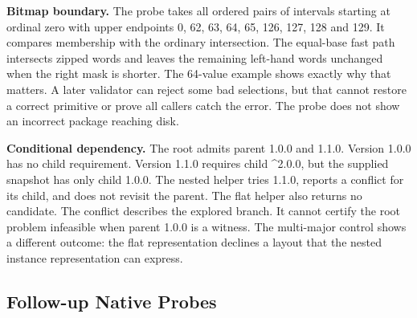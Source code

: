 \documentclass[
  11pt,
  letterpaper,
]{article}
\begin{document}
\textbf{Bitmap boundary.} The probe takes all ordered pairs of intervals
starting at ordinal zero with upper endpoints 0, 62, 63, 64, 65, 126,
127, 128 and 129. It compares membership with the ordinary intersection.
The equal-base fast path intersects zipped words and leaves the
remaining left-hand words unchanged when the right mask is shorter. The
64-value example shows exactly why that matters. A later validator can
reject some bad selections, but that cannot restore a correct primitive
or prove all callers catch the error. The probe does not show an
incorrect package reaching disk.

\textbf{Conditional dependency.} The root admits parent 1.0.0 and 1.1.0.
Version 1.0.0 has no child requirement. Version 1.1.0 requires child
\^{}2.0.0, but the supplied snapshot has only child 1.0.0. The nested
helper tries 1.1.0, reports a conflict for its child, and does not
revisit the parent. The flat helper also returns no candidate. The
conflict describes the explored branch. It cannot certify the root
problem infeasible when parent 1.0.0 is a witness. The multi-major
control shows a different outcome: the flat representation declines a
layout that the nested instance representation can express.

\subsection{Follow-up Native Probes}\label{follow-up-native-probes}
\end{document}
